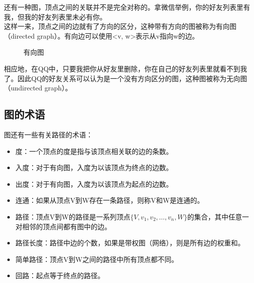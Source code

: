 还有一种图，顶点之间的关联并不是完全对称的。拿微信举例，你的好友列表里有我，但我的好友列表里未必有你。\\

这样一来，顶点之间的边就有了方向的区分，这种带有方向的图被称为有向图（directed graph）。有向边可以使用<v, w>表示从v指向w的边。\\

\begin{figure}[H]
	\centering
	\caption{有向图}
\end{figure}

相应地，在QQ中，只要我把你从好友里删除，你在自己的好友列表里就看不到我了。因此QQ的好友关系可以认为是一个没有方向区分的图，这种图被称为无向图（undirected graph）。

\vspace{0.5cm}

\subsection{图的术语}

图还有一些有关路径的术语：

\begin{itemize}
	\item 度：一个顶点的度是指与该顶点相关联的边的条数。

	\item 入度：对于有向图，入度为以该顶点为终点的边数。

	\item 出度：对于有向图，入度为以该顶点为起点的边数。

	\item 连通：如果从顶点V到W存在一条路径，则称V和W是连通的。

	\item 路径：顶点V到W的路径是一系列顶点$ \{V, v_1, v_2, \dots, v_n, W\} $的集合，其中任意一对相邻的顶点间都有图中的边。

	\item 路径长度：路径中边的个数，如果是带权图（网络），则是所有边的权重和。

	\item 简单路径：顶点V到W之间的路径中所有顶点都不同。

	\item 回路：起点等于终点的路径。
\end{itemize}

